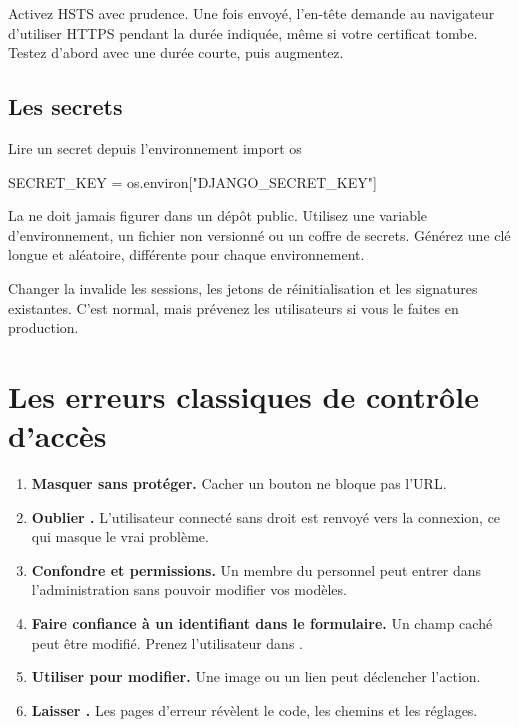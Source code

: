 \begin{attention}
Activez HSTS avec prudence. Une fois envoyé, l'en-tête demande au navigateur
d'utiliser HTTPS pendant la durée indiquée, même si votre certificat tombe. Testez
d'abord avec une durée courte, puis augmentez.
\end{attention}

\subsection{Les secrets}

\begin{codebox}[python]{Lire un secret depuis l'environnement}
import os

SECRET_KEY = os.environ["DJANGO_SECRET_KEY"]
\end{codebox}

\begin{bonne}
La  ne doit jamais figurer dans un dépôt public. Utilisez une
variable d'environnement, un fichier  non versionné ou un coffre de
secrets. Générez une clé longue et aléatoire, différente pour chaque
environnement.
\end{bonne}

\begin{piege}
Changer la  invalide les sessions, les jetons de réinitialisation
et les signatures existantes. C'est normal, mais prévenez les utilisateurs si vous
le faites en production.
\end{piege}

\section{Les erreurs classiques de contrôle d'accès}

\begin{enumerate}
  \item \textbf{Masquer sans protéger.} Cacher un bouton ne bloque pas l'URL.
  \item \textbf{Oublier .} L'utilisateur connecté sans droit
        est renvoyé vers la connexion, ce qui masque le vrai problème.
  \item \textbf{Confondre  et permissions.} Un membre du personnel
        peut entrer dans l'administration sans pouvoir modifier vos modèles.
  \item \textbf{Faire confiance à un identifiant dans le formulaire.} Un champ
        caché  peut être modifié. Prenez l'utilisateur dans
        .
  \item \textbf{Utiliser  pour modifier.} Une image ou un lien peut
        déclencher l'action.
  \item \textbf{Laisser .} Les pages d'erreur révèlent le code,
        les chemins et les réglages.
\end{enumerate}


